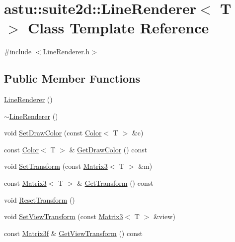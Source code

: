 \hypertarget{classastu_1_1suite2d_1_1LineRenderer}{}\section{astu\+:\+:suite2d\+:\+:Line\+Renderer$<$ T $>$ Class Template Reference}
\label{classastu_1_1suite2d_1_1LineRenderer}


{\ttfamily \#include $<$Line\+Renderer.\+h$>$}

\subsection*{Public Member Functions}
\begin{DoxyCompactItemize}
\item 
\hyperlink{classastu_1_1suite2d_1_1LineRenderer_a8bb16da2cda699189626ffccb8de5857}{Line\+Renderer} ()
\item 
\hyperlink{classastu_1_1suite2d_1_1LineRenderer_a585ff276f2e424e07aba120b0c4d0b7f}{$\sim$\+Line\+Renderer} ()
\item 
void \hyperlink{classastu_1_1suite2d_1_1LineRenderer_a8e1feec71ad1dcddfdd05b575ea60c4c}{Set\+Draw\+Color} (const \hyperlink{classastu_1_1Color}{Color}$<$ T $>$ \&c)
\item 
const \hyperlink{classastu_1_1Color}{Color}$<$ T $>$ \& \hyperlink{classastu_1_1suite2d_1_1LineRenderer_afae46c49dff6da339a099d442f31186b}{Get\+Draw\+Color} () const
\item 
void \hyperlink{classastu_1_1suite2d_1_1LineRenderer_a4b8e9cf9ec1af201d4a757bf06efb427}{Set\+Transform} (const \hyperlink{classastu_1_1Matrix3}{Matrix3}$<$ T $>$ \&m)
\item 
const \hyperlink{classastu_1_1Matrix3}{Matrix3}$<$ T $>$ \& \hyperlink{classastu_1_1suite2d_1_1LineRenderer_a3fb6b33834fd13f556be6660a9395bd9}{Get\+Transform} () const
\item 
void \hyperlink{classastu_1_1suite2d_1_1LineRenderer_a8fbd3ea6e7dd82a7fc6e185c24546c85}{Reset\+Transform} ()
\item 
void \hyperlink{classastu_1_1suite2d_1_1LineRenderer_a3ab4c5bbe44c2f36801800525be62b19}{Set\+View\+Transform} (const \hyperlink{classastu_1_1Matrix3}{Matrix3}$<$ T $>$ \&view)
\item 
const \hyperlink{classastu_1_1Matrix3}{Matrix3f} \& \hyperlink{classastu_1_1suite2d_1_1LineRenderer_a6eee1abb8404e36f2310eb80a88ee340}{Get\+View\+Transform} () const
\item 

\end{DoxyCompactItemize}
